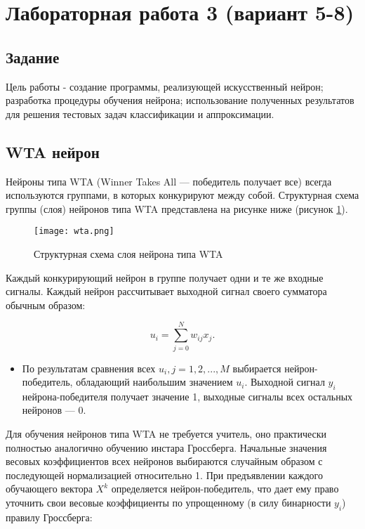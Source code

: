 \newpage
\section{Лабораторная работа 3 (вариант 5-8)}

\subsection{Задание}
Цель работы - создание программы, реализующей искусственный нейрон; разработка процедуры обучения нейрона; использование полученных результатов для решения тестовых задач классификации и аппроксимации.

\subsection{WTA нейрон}
Нейроны типа WTA (Winner Takes All — победитель получает все) всегда используются группами, в которых конкурируют между собой. Структурная схема группы (слоя) нейронов типа WTA представлена на рисунке ниже (рисунок \ref{img:wta}).

\begin{figure}[H]
\centering
\texttt{[image: wta.png]}
\caption{Структурная схема слоя нейрона типа WTA}
\label{img:wta}
\end{figure}

Каждый конкурирующий нейрон в группе получает одни и те же входные сигналы. Каждый нейрон рассчитывает выходной сигнал своего сумматора обычным образом:

\begin{equation}\label{eq:Func}
	u_i=\sum\limits_{j=0}^N w_{ij} x_j.
\end{equation}

\begin{itemize}
\item По результатам сравнения всех $u_i, j=1, 2, ..., M$ выбирается нейрон-победитель, обладающий наибольшим значением $u_i$. Выходной сигнал $y_i$ нейрона-победителя получает значение 1, выходные сигналы всех остальных нейронов — 0.
\end{itemize}

Для обучения нейронов типа WTA не требуется учитель, оно практически полностью аналогично обучению инстара Гроссберга. Начальные значения весовых коэффициентов всех нейронов выбираются случайным образом с последующей нормализацией относительно 1.
При предъявлении каждого обучающего вектора $X^k$ определяется нейрон-победитель, что дает ему право уточнить свои весовые коэффициенты по упрощенному (в силу бинарности $y_i$) правилу Гроссберга:

